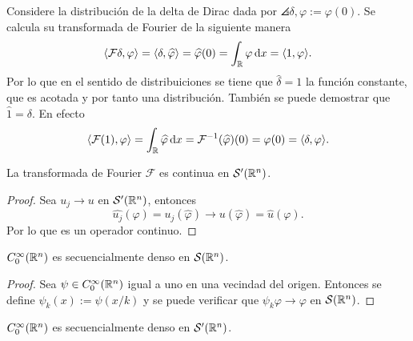 \begin{example}
	Considere la distribución de la delta de Dirac dada por $\angles{\delta, \varphi} := \varphi(0)$.  Se calcula su transformada de Fourier de la siguiente manera
	\begin{equation*}
		\langle\mathcal{F}\delta, \varphi\rangle = \langle\delta, \widehat{\varphi}\rangle = \widehat{\varphi}(0) = \int_{\mathbb{R}} \varphi\mathop{}\!\mathrm{d} x = \langle1, \varphi\rangle.
	\end{equation*}
	Por lo que en el sentido de distribuiciones se tiene que $\widehat{\delta} = 1$ la función constante, que es acotada y por tanto una distribución. También se puede demostrar que $\widehat{1}  = \delta$. En efecto 
	\begin{equation*}
		\langle\mathcal{F}(1), \varphi\rangle = \int_{\mathbb{R}} \widehat{\varphi} \mathop{}\!\mathrm{d} x = 
		\mathcal{F}^{-1}(\widehat{\varphi})(0) = \varphi(0)  = \langle\delta, \varphi\rangle.
	\end{equation*}
\end{example}
\begin{theorem}
	La transformada de Fourier $\mathcal{F}$ es continua en $\mathcal{S}'(\mathbb{R}^n)$.
\end{theorem}
\begin{proof}
	Sea $u_j\rightarrow u$ en $\mathcal{S}'(\mathbb{R}^n)$, entonces
	\begin{equation*}
		\widehat{u_j}(\varphi) = u_j(\widehat{\varphi}) \rightarrow u(\widehat{\varphi}) = \widehat{u}(\varphi).
	\end{equation*}
	Por lo que es un operador continuo.
\end{proof}
\begin{lemma}
	$C^\infty_0(\mathbb{R}^n)$ es secuencialmente denso en $\mathcal{S}(\mathbb{R}^n)$.
\end{lemma}
\begin{proof}
	Sea $\psi\in C^\infty_0(\mathbb{R}^n)$ igual a uno en una vecindad del origen. Entonces se define $\psi_k(x) := \psi(x/k)$ y se puede verificar que $\psi_k\varphi\rightarrow\varphi$ en $\mathcal{S}(\mathbb{R}^n)$.
\end{proof}
\begin{theorem}
	$C^\infty_0(\mathbb{R}^n)$ es secuencialmente denso en $\mathcal{S}'(\mathbb{R}^n)$.
\end{theorem}
